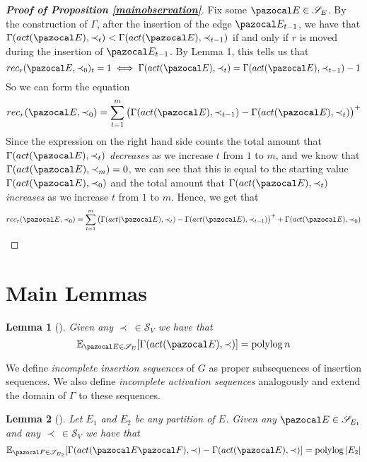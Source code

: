 \documentclass{article}
\newtheorem{lemma}{Lemma}
\DeclareMathOperator*{\polylog}{polylog}
\begin{document}
\begin{proof}[\textbf{Proof of Proposition \ref{mainobservation}}]
Fix some $\pazocal E \in \mathcal S_E$. By the construction of $\Gamma$, after the insertion of the edge $\pazocal E_{t-1}$, we have that $\Gamma(act(\pazocal E), \prec_{t}) < \Gamma(act(\pazocal E), \prec_{t-1})$ if and only if $r$ is moved during the insertion of $\pazocal E_{t-1}$. By Lemma 1, this tells us that
\[ rec_r(\pazocal E, \prec_{0})_t = 1 \iff \Gamma(act(\pazocal E), \prec_{t}) = \Gamma(act(\pazocal E), \prec_{t-1}) - 1 \]
So we can form the equation
\[ rec_r(\pazocal E, \prec_0) =  \sum_{t=1}^{m}\big(\Gamma(act(\pazocal E), \prec_{t-1}) - \Gamma(act(\pazocal E), \prec_{t})\big)^+ \]
Since the expression on the right hand side counts the total amount that $\Gamma(act(\pazocal E), \prec_{t})$ \textit{decreases} as we increase $t$ from $1$ to $m$, and we know that $\Gamma(act(\pazocal E), \prec_{m}) = 0$, we can see that this is equal to the starting value $\Gamma(act(\pazocal E), \prec_0)$ and the total amount that $\Gamma(act(\pazocal E), \prec_{t})$ \textit{increases} as we increase $t$ from $1$ to $m$. Hence, we get that
\[ rec_r(\pazocal E, \prec_0) =  \sum_{t=1}^{m}\big(\Gamma(act(\pazocal E), \prec_{t}) - \Gamma(act(\pazocal E), \prec_{t-1})\big)^+ + \Gamma(act(\pazocal E), \prec_0) \]
\end{proof}

\section{Main Lemmas}

\begin{lemma}[\color{red}{UNPROVEN}\color{black}] Given any $\prec \: \in \mathcal S_V$ we have that
\[ \mathbb E_{\pazocal E \in \mathcal S_E}[\Gamma(act(\pazocal E), \prec)] = \polylog n \]
\end{lemma}

We define \textit{incomplete insertion sequences} of $G$ as proper subsequences of insertion sequences. We also define \textit{incomplete activation sequences} analogously and extend the domain of $\Gamma$ to these sequences.

\begin{lemma}[\color{red}{UNPROVEN}\color{black}]
Let $E_1$ and $E_2$ be any partition of $E$. Given any $\pazocal E \in \mathcal S_{E_1}$ and any $\prec \: \in \mathcal S_V$ we have that
\[ \mathbb E_{\pazocal F \in \mathcal S_{E_2}}[\Gamma(act(\pazocal E \pazocal F), \prec) - \Gamma(act(\pazocal E), \prec)] = \polylog{\vert E_2 \vert} \]
\end{lemma}
\end{document}
